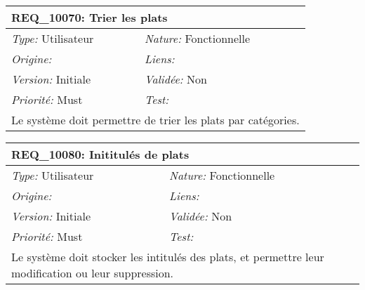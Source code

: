 \begin{table}[!h]

\begin{tabular}{|p{60mm}p{100mm}|}

\hline

\multicolumn{2}{|l|}{\textbf{REQ\_10070:} Trier les plats} \\ \hline

\emph{Type:} Utilisateur & \emph{Nature:} Fonctionnelle \\

\emph{Origine:}  & \emph{Liens:}  \\

\emph{Version:} Initiale & \emph{Validée:} Non \\

\emph{Priorité:} Must & \emph{Test:} \\ \hline

\multicolumn{2}{|p{16cm}|}{Le système doit permettre de trier les plats par catégories.} \\ \hline

\end{tabular}

\end{table}



\begin{table}[!h]

\begin{tabular}{|p{60mm}p{100mm}|}

\hline

\multicolumn{2}{|l|}{\textbf{REQ\_10080:} Inititulés de plats} \\ \hline

\emph{Type:} Utilisateur & \emph{Nature:} Fonctionnelle \\

\emph{Origine:}  & \emph{Liens:}  \\

\emph{Version:} Initiale & \emph{Validée:} Non \\

\emph{Priorité:} Must & \emph{Test:} \\ \hline

\multicolumn{2}{|p{16cm}|}{Le système doit stocker les intitulés des plats, et permettre leur modification ou leur suppression.} \\ \hline

\end{tabular}

\end{table}



